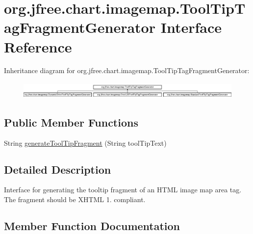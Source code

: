 \hypertarget{interfaceorg_1_1jfree_1_1chart_1_1imagemap_1_1_tool_tip_tag_fragment_generator}{}\section{org.\+jfree.\+chart.\+imagemap.\+Tool\+Tip\+Tag\+Fragment\+Generator Interface Reference}
\label{interfaceorg_1_1jfree_1_1chart_1_1imagemap_1_1_tool_tip_tag_fragment_generator}
Inheritance diagram for org.\+jfree.\+chart.\+imagemap.\+Tool\+Tip\+Tag\+Fragment\+Generator\+:\begin{figure}[H]
\begin{center}
\leavevmode
\includegraphics[height=0.893142cm]{interfaceorg_1_1jfree_1_1chart_1_1imagemap_1_1_tool_tip_tag_fragment_generator}
\end{center}
\end{figure}
\subsection*{Public Member Functions}
\begin{DoxyCompactItemize}
\item 
String \mbox{\hyperlink{interfaceorg_1_1jfree_1_1chart_1_1imagemap_1_1_tool_tip_tag_fragment_generator_a4e96c861b1fa7000056ed50c9ade7484}{generate\+Tool\+Tip\+Fragment}} (String tool\+Tip\+Text)
\end{DoxyCompactItemize}


\subsection{Detailed Description}
Interface for generating the tooltip fragment of an H\+T\+ML image map area tag. The fragment should be {\ttfamily X\+H\+T\+ML 1.} compliant. 

\subsection{Member Function Documentation}
\mbox{\label{interfaceorg_1_1jfree_1_1chart_1_1imagemap_1_1_tool_tip_tag_fragment_generator_a4e96c861b1fa7000056ed50c9ade7484}} 
